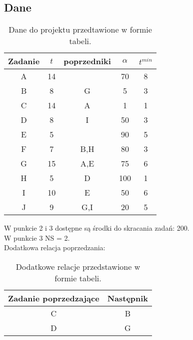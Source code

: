 \documentclass[
    12pt, %
]{../fphw}
\begin{document}
\subsection{Dane}
\begin{table}[H]
    \centering
    \begin{tabular} {| c | c | c | c | c |}
        \hline
        Zadanie & \(t\) & poprzedniki & \(\alpha\) & \(t^{min}\) \\
        \hline
        A       & 14    &             & 70         & 8           \\
        \hline
        B       & 8     & G           & 5          & 3           \\
        \hline
        C       & 14    & A           & 1          & 1           \\
        \hline
        D       & 8     & I           & 50         & 3           \\
        \hline
        E       & 5     &             & 90         & 5           \\
        \hline
        F       & 7     & B,H         & 80         & 3           \\
        \hline
        G       & 15    & A,E         & 75         & 6           \\
        \hline
        H       & 5     & D           & 100        & 1           \\
        \hline
        I       & 10    & E           & 50         & 6           \\
        \hline
        J       & 9     & G,I         & 20         & 5           \\
        \hline
    \end{tabular}
    \caption{Dane do projektu przedtawione w formie tabeli.}
    \label{tab:dane}
\end{table}
W punkcie 2 i 3 dostępne są środki do skracania zadań: 200. \\
W punkcie 3 NS = 2. \\
Dodatkowa relacja poprzedzania: \\
\begin{table}[H]
    \centering
    \begin{tabular}{| c | c |}
        \hline
        Zadanie poprzedzające & Następnik \\
        \hline
        C & B \\
        \hline
        D & G \\
        \hline
    \end{tabular}
    \caption{Dodatkowe relacje przedstawione w formie tabeli.}
    \label{tab:dod_rel}  
\end{table}
\newpage
\end{document}
